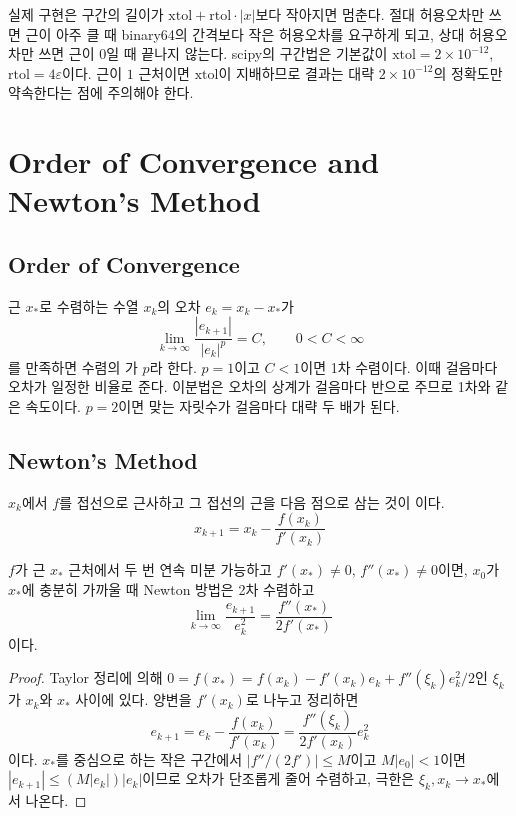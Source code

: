 실제 구현은 구간의 길이가 $\mathrm{xtol}+\mathrm{rtol}\cdot|x|$보다 작아지면 멈춘다. 절대 허용오차만 쓰면 근이 아주 클 때 binary64의 간격보다 작은 허용오차를 요구하게 되고, 상대 허용오차만 쓰면 근이 $0$일 때 끝나지 않는다. scipy의 구간법은 기본값이 $\mathrm{xtol}=2\times10^{-12}$, $\mathrm{rtol}=4\varepsilon$이다. 근이 $1$ 근처이면 $\mathrm{xtol}$이 지배하므로 결과는 대략 $2\times10^{-12}$의 정확도만 약속한다는 점에 주의해야 한다.

\section{Order of Convergence and Newton's Method}
\label{sec:newton}

\subsection{Order of Convergence}

근 $x_\ast$로 수렴하는 수열 $x_k$의 오차 $e_k=x_k-x_\ast$가
\[
\lim_{k\to\infty}\frac{|e_{k+1}|}{|e_k|^p}=C,\qquad0<C<\infty
\]
를 만족하면 수렴의 가 $p$라 한다. $p=1$이고 $C<1$이면 1차 수렴이다. 이때 걸음마다 오차가 일정한 비율로 준다. 이분법은 오차의 상계가 걸음마다 반으로 주므로 1차와 같은 속도이다. $p=2$이면 맞는 자릿수가 걸음마다 대략 두 배가 된다.

\subsection{Newton's Method}

$x_k$에서 $f$를 접선으로 근사하고 그 접선의 근을 다음 점으로 삼는 것이 이다.
\[
x_{k+1}=x_k-\frac{f(x_k)}{f'(x_k)}
\]

\begin{theorem}
\label{thm:newton-quadratic}
$f$가 근 $x_\ast$ 근처에서 두 번 연속 미분 가능하고 $f'(x_\ast)\ne0$, $f''(x_\ast)\ne0$이면, $x_0$가 $x_\ast$에 충분히 가까울 때 Newton 방법은 2차 수렴하고
\[
\lim_{k\to\infty}\frac{e_{k+1}}{e_k^2}=\frac{f''(x_\ast)}{2f'(x_\ast)}
\]
이다.
\end{theorem}

\begin{proof}
Taylor 정리에 의해 $0=f(x_\ast)=f(x_k)-f'(x_k)e_k+f''(\xi_k)e_k^2/2$인 $\xi_k$가 $x_k$와 $x_\ast$ 사이에 있다. 양변을 $f'(x_k)$로 나누고 정리하면
\[
e_{k+1}=e_k-\frac{f(x_k)}{f'(x_k)}=\frac{f''(\xi_k)}{2f'(x_k)}e_k^2
\]
이다. $x_\ast$를 중심으로 하는 작은 구간에서 $|f''/(2f')|\le M$이고 $M|e_0|<1$이면 $|e_{k+1}|\le(M|e_k|)|e_k|$이므로 오차가 단조롭게 줄어 수렴하고, 극한은 $\xi_k,x_k\to x_\ast$에서 나온다.
\end{proof}

